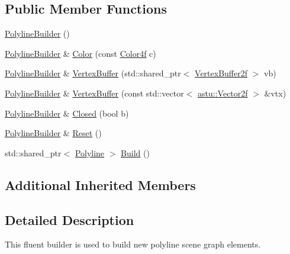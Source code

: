 \subsection*{Public Member Functions}
\begin{DoxyCompactItemize}
\item 
\hyperlink{classastu_1_1suite2d_1_1PolylineBuilder_ae83654b1bd5d3720e73c0498d3036bd7}{Polyline\+Builder} ()
\item 
\hyperlink{classastu_1_1suite2d_1_1PolylineBuilder}{Polyline\+Builder} \& \hyperlink{classastu_1_1suite2d_1_1PolylineBuilder_a82a2c90c19baa65e7744251e3e4bc912}{Color} (const \hyperlink{classastu_1_1Color}{Color4f} c)
\item 
\hyperlink{classastu_1_1suite2d_1_1PolylineBuilder}{Polyline\+Builder} \& \hyperlink{classastu_1_1suite2d_1_1PolylineBuilder_ab18b7920a7899600091809d701a72352}{Vertex\+Buffer} (std\+::shared\+\_\+ptr$<$ \hyperlink{group__gfx__group_ga081cf45a441eef100dfbb1e0f64c3826}{Vertex\+Buffer2f} $>$ vb)
\item 
\hyperlink{classastu_1_1suite2d_1_1PolylineBuilder}{Polyline\+Builder} \& \hyperlink{classastu_1_1suite2d_1_1PolylineBuilder_afde258633587f124e611f1b5da3a8144}{Vertex\+Buffer} (const std\+::vector$<$ \hyperlink{classastu_1_1Vector2}{astu\+::\+Vector2f} $>$ \&vtx)
\item 
\hyperlink{classastu_1_1suite2d_1_1PolylineBuilder}{Polyline\+Builder} \& \hyperlink{classastu_1_1suite2d_1_1PolylineBuilder_a62ad72073b3642bb70f08c1a7ae99783}{Closed} (bool b)
\item 
\hyperlink{classastu_1_1suite2d_1_1PolylineBuilder}{Polyline\+Builder} \& \hyperlink{classastu_1_1suite2d_1_1PolylineBuilder_a292fa2f729bf07f05b1496bdb854208b}{Reset} ()
\item 
std\+::shared\+\_\+ptr$<$ \hyperlink{classastu_1_1suite2d_1_1Polyline}{Polyline} $>$ \hyperlink{classastu_1_1suite2d_1_1PolylineBuilder_aefeb3a1648e8d9a3279f994c60938d1e}{Build} ()
\end{DoxyCompactItemize}
\subsection*{Additional Inherited Members}


\subsection{Detailed Description}
This fluent builder is used to build new polyline scene graph elements.


